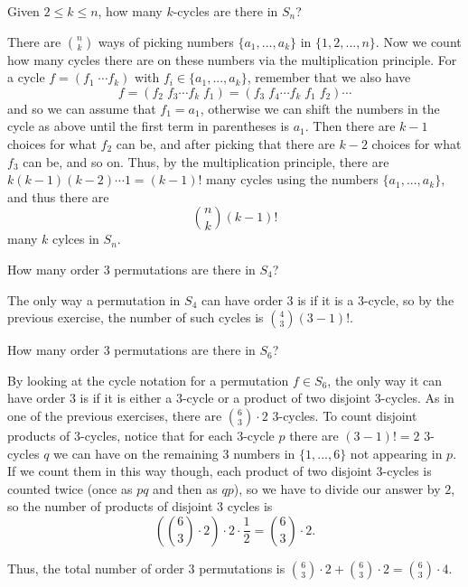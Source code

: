 \documentclass[11pt,dvipsnames]{book}
\numberwithin{figure}{section} %
\numberwithin{table}{section} %
\begin{document}
\begin{exercise}
Given $2\leq k\leq n$, how many $k$-cycles are there in $S_{n}$?

\begin{solution}
There are ${n \choose k}$ ways of picking numbers $\{a_{1},...,a_{k}\}$ in $\{1,2,...,n\}$. Now we count how many cycles there are on these numbers via the multiplication principle. For a cycle $f=(f_{1} \; \cdots  f_{k})$ with $f_{i}\in  \{a_{1},...,a_{k}\}$, remember that we also have 
\[
f=(f_{2} \; f_{3}\cdots f_{k} \; f_{1}) 
=(f_{3} \; f_{4} \cdots f_{k} \; f_{1} \; f_{2})\cdots
\]
and so we can assume that $f_{1} = a_{1}$, otherwise we can shift the numbers in the cycle as above until the first term in parentheses is $a_{1}$. Then there are $k-1$ choices for what $f_{2}$ can be, and after picking that there are $k-2$ choices for what $f_{3}$ can be, and so on. Thus, by the multiplication principle, there are $k(k-1)(k-2)\cdots 1=(k-1)!$ many cycles using the numbers  $\{a_{1},...,a_{k}\}$, and thus there are
\[
{n \choose k} (k-1)!
\]
many $k$ cylces in $S_{n}$. 
\end{solution}

\end{exercise}


\begin{exercise}
How many order $3$ permutations are there in $S_{4}$?
\begin{solution}
The only way a permutation in $S_{4}$ can have order $3$ is if it is a $3$-cycle, so by the previous exercise, the number of such cycles is ${4 \choose 3}(3-1)!$.
\end{solution}
\end{exercise}

\begin{exercise}
How many order $3$ permutations are there in $S_{6}$?


\begin{solution}
By looking at the cycle notation for a permutation $f\in S_{6}$, the only way it can have order $3$ is if it is either a $3$-cycle or a product of two disjoint $3$-cycles. As in one of the previous exercises, there are ${6\choose 3}\cdot 2$ $3$-cycles. To count disjoint products of $3$-cycles, notice that for each $3$-cycle $p$ there are $(3-1)!=2$ $3$-cycles $q$ we can have on the remaining $3$ numbers in $\{1,...,6\}$ not appearing in $p$. If we count them in this way though, each product of two disjoint $3$-cycles is counted twice (once as $pq$ and then as $qp$), so we have to divide our answer by $2$, so the number of products of disjoint $3$ cycles is 
\[
\left( {6\choose 3} \cdot 2\right) \cdot 2\cdot\frac{1}{2} = {6\choose 3} \cdot 2.
\]
\end{solution}
Thus, the total number of order $3$ permutations is ${6\choose 3} \cdot 2+ {6\choose 3} \cdot 2= {6\choose 3} \cdot 4$.
\end{exercise}
\end{document}
